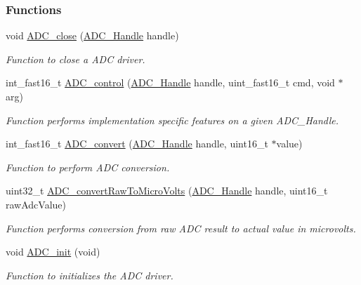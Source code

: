 \subsubsection*{Functions}
\begin{DoxyCompactItemize}
\item 
void \hyperlink{_a_d_c_8h_adb49f74bdef5e3e45ee5de306c5dfc08}{A\+D\+C\+\_\+close} (\hyperlink{_a_d_c_8h_ac98b1222559c172df43505d672e1376c}{A\+D\+C\+\_\+\+Handle} handle)
\begin{DoxyCompactList}\small\item\em Function to close a A\+D\+C driver. \end{DoxyCompactList}\item 
int\+\_\+fast16\+\_\+t \hyperlink{_a_d_c_8h_af4be7e5e4f5cc931f4501a542d689c32}{A\+D\+C\+\_\+control} (\hyperlink{_a_d_c_8h_ac98b1222559c172df43505d672e1376c}{A\+D\+C\+\_\+\+Handle} handle, uint\+\_\+fast16\+\_\+t cmd, void $\ast$arg)
\begin{DoxyCompactList}\small\item\em Function performs implementation specific features on a given A\+D\+C\+\_\+\+Handle. \end{DoxyCompactList}\item 
int\+\_\+fast16\+\_\+t \hyperlink{_a_d_c_8h_afcac5582b8be42a7740091d150aef05c}{A\+D\+C\+\_\+convert} (\hyperlink{_a_d_c_8h_ac98b1222559c172df43505d672e1376c}{A\+D\+C\+\_\+\+Handle} handle, uint16\+\_\+t $\ast$value)
\begin{DoxyCompactList}\small\item\em Function to perform A\+D\+C conversion. \end{DoxyCompactList}\item 
uint32\+\_\+t \hyperlink{_a_d_c_8h_a81e762c06c3957c01d3271bdecef358d}{A\+D\+C\+\_\+convert\+Raw\+To\+Micro\+Volts} (\hyperlink{_a_d_c_8h_ac98b1222559c172df43505d672e1376c}{A\+D\+C\+\_\+\+Handle} handle, uint16\+\_\+t raw\+Adc\+Value)
\begin{DoxyCompactList}\small\item\em Function performs conversion from raw A\+D\+C result to actual value in microvolts. \end{DoxyCompactList}\item 
void \hyperlink{_a_d_c_8h_a4b4a2ddcb45df0c8497c47d4ed800e2a}{A\+D\+C\+\_\+init} (void)
\begin{DoxyCompactList}\small\item\em Function to initializes the A\+D\+C driver. \end{DoxyCompactList}\item 

\end{DoxyCompactItemize}
